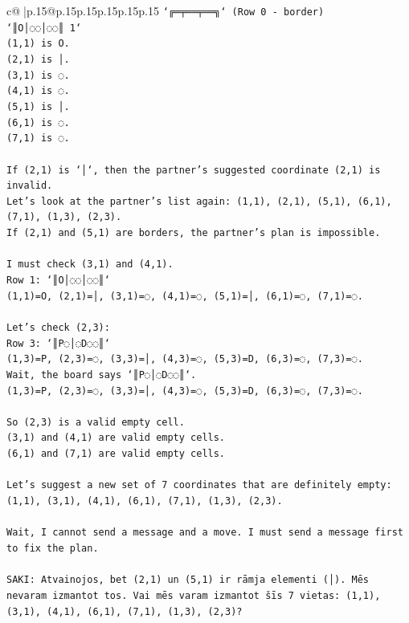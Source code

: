 \documentclass{article}
\begin{document}
{\begin{supertabular}{c@{$\;$}|p{.15\linewidth}@{}p{.15\linewidth}p{.15\linewidth}p{.15\linewidth}p{.15\linewidth}p{.15\linewidth}}
{{{\texttt{`╔═╤══╤══╗` (Row 0 {-} border)} \\
\texttt{`║O│◌◌│◌◌║ 1`} \\
\texttt{(1,1) is O.} \\
\texttt{(2,1) is │.} \\
\texttt{(3,1) is ◌.} \\
\texttt{(4,1) is ◌.} \\
\texttt{(5,1) is │.} \\
\texttt{(6,1) is ◌.} \\
\texttt{(7,1) is ◌.} \\
\\ 
\texttt{If (2,1) is `│`, then the partner's suggested coordinate (2,1) is invalid.} \\
\texttt{Let's look at the partner's list again: (1,1), (2,1), (5,1), (6,1), (7,1), (1,3), (2,3).} \\
\texttt{If (2,1) and (5,1) are borders, the partner's plan is impossible.} \\
\\ 
\texttt{I must check (3,1) and (4,1).} \\
\texttt{Row 1: `║O│◌◌│◌◌║`} \\
\texttt{(1,1)=O, (2,1)=│, (3,1)=◌, (4,1)=◌, (5,1)=│, (6,1)=◌, (7,1)=◌.} \\
\\ 
\texttt{Let's check (2,3):} \\
\texttt{Row 3: `║P◌│◌D◌◌║`} \\
\texttt{(1,3)=P, (2,3)=◌, (3,3)=│, (4,3)=◌, (5,3)=D, (6,3)=◌, (7,3)=◌.} \\
\texttt{Wait, the board says `║P◌│◌D◌◌║`.} \\
\texttt{(1,3)=P, (2,3)=◌, (3,3)=│, (4,3)=◌, (5,3)=D, (6,3)=◌, (7,3)=◌.} \\
\\ 
\texttt{So (2,3) is a valid empty cell.} \\
\texttt{(3,1) and (4,1) are valid empty cells.} \\
\texttt{(6,1) and (7,1) are valid empty cells.} \\
\\ 
\texttt{Let's suggest a new set of 7 coordinates that are definitely empty:} \\
\texttt{(1,1), (3,1), (4,1), (6,1), (7,1), (1,3), (2,3).} \\
\\ 
\texttt{Wait, I cannot send a message and a move. I must send a message first to fix the plan.} \\
\\ 
\texttt{SAKI: Atvainojos, bet (2,1) un (5,1) ir rāmja elementi (│). Mēs nevaram izmantot tos. Vai mēs varam izmantot šīs 7 vietas: (1,1), (3,1), (4,1), (6,1), (7,1), (1,3), (2,3)?} \\
            }
        }
    }
     \\ \\


\end{supertabular}}
\end{document}
